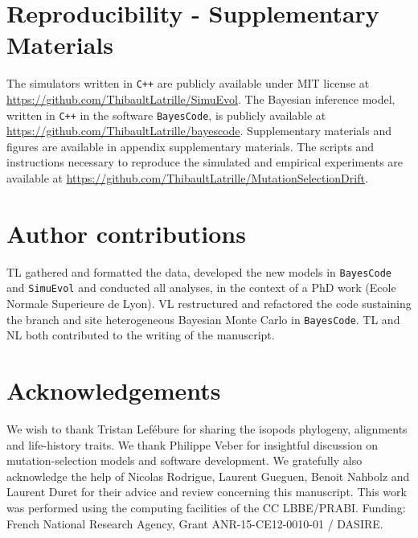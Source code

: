 \documentclass{MBE}
\begin{document}
	\section{Reproducibility - Supplementary Materials}
	The simulators written in \texttt{C++} are publicly available under MIT license at \url{https://github.com/ThibaultLatrille/SimuEvol}.
	The Bayesian inference model, written in \texttt{C++} in the software \texttt{BayesCode}, is publicly available at \url{https://github.com/ThibaultLatrille/bayescode}.
	Supplementary materials and figures are available in appendix supplementary materials.
	The scripts and instructions necessary to reproduce the simulated and empirical experiments are available at \url{https://github.com/ThibaultLatrille/MutationSelectionDrift}.

	\section{Author contributions}
	TL gathered and formatted the data, developed the new models in \texttt{BayesCode} and \texttt{SimuEvol} and conducted all analyses, in the context of a PhD work (Ecole Normale Superieure de Lyon).
	VL restructured and refactored the code sustaining the branch and site heterogeneous Bayesian Monte Carlo in \texttt{BayesCode}.
	TL and NL both contributed to the writing of the manuscript.

	\section{Acknowledgements}
	We wish to thank Tristan Lefébure for sharing the isopods phylogeny, alignments and life-history traits.
	We thank Philippe Veber for insightful discussion on mutation-selection models and software development.
	We gratefully also acknowledge the help of Nicolas Rodrigue, Laurent Gueguen, Benoit Nahbolz and Laurent Duret for their advice and review concerning this manuscript.
	This work was performed using the computing facilities of the CC LBBE/PRABI.
	Funding: French National Research Agency, Grant ANR-15-CE12-0010-01 / DASIRE.

	
\end{document}
